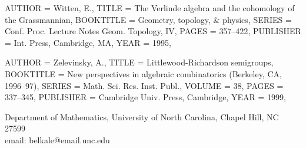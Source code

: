 \begin{bibdiv}
\begin{biblist}
 {
    AUTHOR = {Witten, E.},
     TITLE = {The {V}erlinde algebra and the cohomology of the
              {G}rassmannian},
 BOOKTITLE = {Geometry, topology, \& physics},
    SERIES = {Conf. Proc. Lecture Notes Geom. Topology, IV},
     PAGES = {357--422},
 PUBLISHER = {Int. Press, Cambridge, MA},
      YEAR = {1995},
}

 {
    AUTHOR = {Zelevinsky, A.},
     TITLE = {Littlewood-{R}ichardson semigroups},
 BOOKTITLE = {New perspectives in algebraic combinatorics ({B}erkeley, {CA},
              1996--97)},
    SERIES = {Math. Sci. Res. Inst. Publ.},
    VOLUME = {38},
     PAGES = {337--345},
 PUBLISHER = {Cambridge Univ. Press, Cambridge},
      YEAR = {1999},
}


\end{biblist}
\end{bibdiv}





Department of Mathematics, University of North Carolina, Chapel Hill, NC 27599\\
{{email: belkale@email.unc.edu}}
